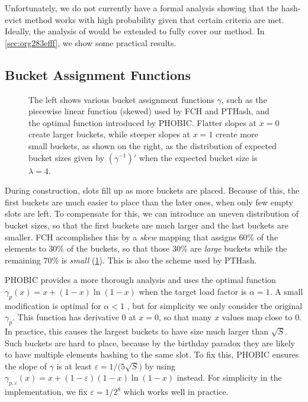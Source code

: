 \documentclass[a4paper,UKenglish,cleveref,thm-restate]{lipics-v2021}
\begin{document}
 Unfortunately, we do not currently have a formal analysis showing
that the hash-evict method works with high probability given that certain
criteria are met. Ideally, the analysis of \cite[Section 5]{phobic-thesis} would
be extended to fully cover our method. In \cref{sec:org283efff}, we show some practical results.
\subsection{Bucket Assignment Functions}

\begin{figure}[t]
  \centering
  \begin{subfigure}[t]{0.49\linewidth}
    
  \end{subfigure}
  \hfill
  \begin{subfigure}[t]{0.49\linewidth}
    
  \end{subfigure}
\caption{\label{bucket-fn}The left shows various bucket assignment functions \(\gamma\), such as the piecewise linear function (skewed) used by FCH and PTHash, and the optimal function introduced by PHOBIC. Flatter slopes at \(x=0\) create larger buckets, while steeper slopes at \(x=1\) create more small buckets, as shown on the right, as the distribution of expected bucket sizes given by \((\gamma^{-1})'\) when the expected bucket size is \(\lambda=4\).}
\end{figure}

During construction, slots fill up as more buckets are
placed. Because of this, the first buckets are much easier to place than the
later ones, when only few empty slots are left.
To compensate for this, we can introduce an uneven distribution of bucket
sizes, so that the first buckets are much larger and the last buckets
are smaller.
FCH \cite{fch} accomplishes this by a \emph{skew} mapping that assigns \(60\%\) of the
elements to \(30\%\) of the
buckets, so that those \(30\%\) are \emph{large} buckets while the remaining \(70\%\)
is \emph{small} (\cref{bucket-fn}). This is also the scheme used by PTHash.

PHOBIC \cite{phobic} provides a more thorough analysis and uses the optimal function
\(\gamma_p(x) = x + (1-x)\ln (1-x)\) when the target load factor is \(\alpha=1\).
A small modification is optimal for \(\alpha<1\) \cite[Appendix B]{phobic-full},
but for simplicity we only consider the original \(\gamma_p\).
This function has derivative 0 at \(x=0\), so
that many \(x\) values map close to 0.
In practice, this causes the largest buckets to have size much larger than \(\sqrt S\).
Such buckets are hard to place, because by the birthday paradox they are likely
to have multiple elements hashing to the same slot. To fix this, PHOBIC ensures the
slope of \(\gamma\) is at least \(\varepsilon=1/\big(5 \sqrt S\big)\) by using
\(\gamma_{p,\varepsilon}(x) = x + (1-\varepsilon)(1-x)\ln(1-x)\) instead.
For simplicity in the implementation, we fix \(\varepsilon = 1/{2^8}\) which works
well in practice.
\end{document}
